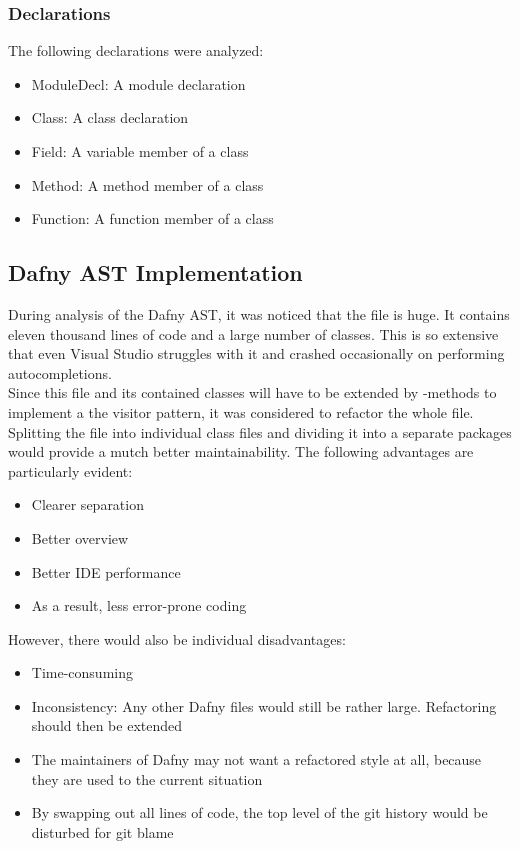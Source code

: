 \subsubsection{Declarations}
The following declarations were analyzed:
\begin{itemize}
    \item ModuleDecl: A module declaration
    \item Class: A class declaration
    \item Field: A variable member of a class
    \item Method: A method member of a class
    \item Function: A function member of a class
\end{itemize}



\subsection{Dafny AST Implementation}
During analysis of the Dafny AST, it was noticed that the file  is huge.
It contains eleven thousand lines of code and a large number of classes.
This is so extensive that even Visual Studio struggles with it and crashed occasionally on performing autocompletions.\\

Since this file and its contained classes will have to be extended by -methods
to implement a the visitor pattern, it was considered to refactor the whole file.\\

Splitting the file into individual class files and dividing it into a separate packages would provide a mutch better maintainability.
The following advantages are particularly evident:
\begin{itemize}
    \item Clearer separation
    \item Better overview
    \item Better IDE performance
    \item As a result, less error-prone coding
\end{itemize}

However, there would also be individual disadvantages:
\begin{itemize}
    \item Time-consuming
    \item Inconsistency: Any other Dafny files would still be rather large. Refactoring should then be extended
    \item The maintainers of Dafny may not want a refactored style at all, because they are used to the current situation
    \item By swapping out all lines of code, the top level of the git history would be disturbed for git blame
\end{itemize}

